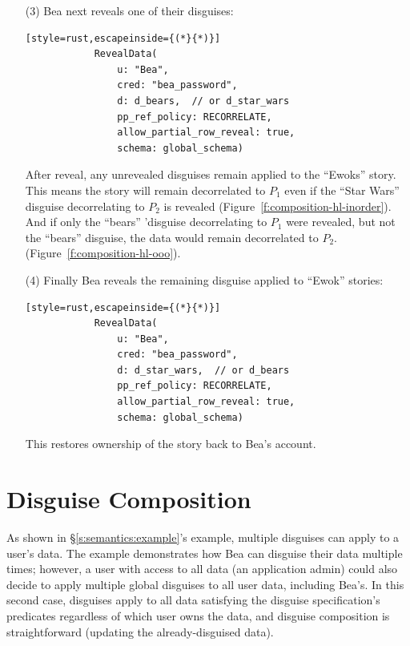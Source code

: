 \begin{enumerate}[nosep]
    \item[(3)] Bea next reveals one of their disguises:
        \vspace{12pt}
        \begin{lstlisting}[style=rust,escapeinside={(*}{*)}]
            RevealData(
                u: "Bea", 
                cred: "bea_password",
                d: d_bears,  // or d_star_wars
                pp_ref_policy: RECORRELATE,
                allow_partial_row_reveal: true,
                schema: global_schema)
        \end{lstlisting}

        After reveal, any unrevealed disguises remain applied to the ``Ewoks''
        story.
        This means the story will remain decorrelated to $P_1$ even if the ``Star
        Wars'' disguise decorrelating to $P_2$ is revealed
        (Figure~\ref{f:composition-hl-inorder}).
        And if only the ``bears'' 'disguise decorrelating to $P_1$ were
        revealed, but not the ``bears'' disguise, the data would remain
        decorrelated to $P_2$.  (Figure~\ref{f:composition-hl-ooo}).

    \item[(4)] Finally Bea reveals the remaining disguise applied to ``Ewok''
        stories:

        \vspace{12pt}
        \begin{lstlisting}[style=rust,escapeinside={(*}{*)}]
            RevealData(
                u: "Bea", 
                cred: "bea_password",
                d: d_star_wars,  // or d_bears
                pp_ref_policy: RECORRELATE,
                allow_partial_row_reveal: true,
                schema: global_schema)
        \end{lstlisting}
        
        This restores ownership of the story back to Bea's account.

\end{enumerate}


\section{Disguise Composition}
\label{s:semantics:hl:composition}

As shown in \S\ref{s:semantics:example}'s example, multiple disguises can apply
to a user's data. The example demonstrates how Bea can disguise their data
multiple times; however, a user with access to all data (\eg an application
admin) could also decide to apply multiple global disguises to all user data,
including Bea's.  In this second case, disguises apply to all data satisfying
the disguise specification's predicates regardless of which user owns the data,
and disguise composition is straightforward (updating the already-disguised
data).

